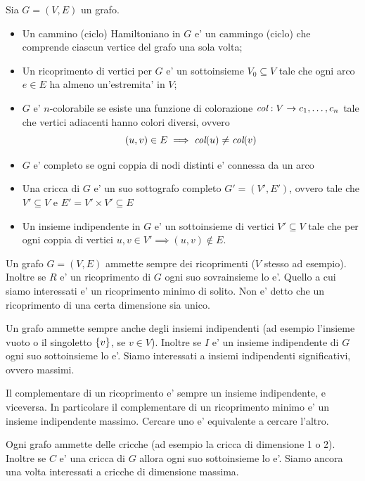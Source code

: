 \begin{defn}
    Sia $G = (V,E)$ un grafo.
    \begin{itemize}
        \item Un cammino (ciclo) Hamiltoniano in $G$ e' un cammingo (ciclo) che comprende ciascun
        vertice del grafo una sola volta;
        \item Un ricoprimento di vertici per $G$ e' un sottoinsieme $V_{0} \subseteq V$ tale che
        ogni arco $e \in E$ ha almeno un'estremita' in $V$;
        \item $G$ e' $n$-colorabile se esiste una funzione di colorazione $\textit{col}: V \to
        c_{1},\dotsc,c_{n}$ tale che vertici adiacenti hanno colori diversi, ovvero
        \begin{equation*}
            (u,v) \in E \implies \textit{col}(u) \not= \textit{col}(v)
        \end{equation*}
        \item $G$ e' completo se ogni coppia di nodi distinti e' connessa da un arco
        \item Una cricca di $G$ e' un suo sottografo completo $G' = (V',E')$, ovvero tale che $V'
        \subseteq V$ e $E' = V' \times V' \subseteq E$
        \item Un insieme indipendente in $G$ e' un sottoinsieme di vertici $V' \subseteq V$ tale che
        per ogni coppia di vertici $u,v \in V' \implies (u,v) \notin E$.
    \end{itemize}
\end{defn}

Un grafo $G=(V,E)$ ammette sempre dei ricoprimenti ($V$ stesso ad esempio). Inoltre se $R$ e' un
ricoprimento di $G$ ogni suo sovrainsieme lo e'. Quello a cui siamo interessati e' un ricoprimento
minimo di solito. Non e' detto che un ricoprimento di una certa dimensione sia unico.

Un grafo ammette sempre anche degli insiemi indipendenti (ad esempio l'insieme vuoto o il singoletto
$\{v\}$, se $v \in V$). Inoltre se $I$ e' un insieme indipendente di $G$ ogni suo sottoinsieme lo
e'. Siamo interessati a insiemi indipendenti significativi, ovvero massimi.

Il complementare di un ricoprimento e' sempre un insieme indipendente, e viceversa. In particolare il
complementare di un ricoprimento minimo e' un insieme indipendente massimo. Cercare uno e'
equivalente a cercare l'altro.

Ogni grafo ammette delle cricche (ad esempio la cricca di dimensione 1 o 2). Inoltre se $C$ e' una
cricca di $G$ allora ogni suo sottoinsieme lo e'. Siamo ancora una volta interessati a cricche di
dimensione massima.

